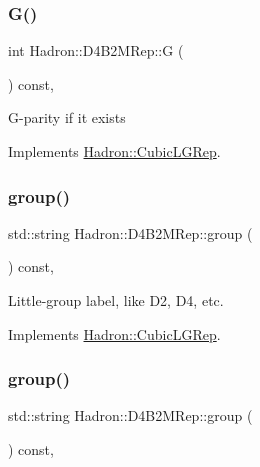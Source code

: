 \subsubsection{\texorpdfstring{G()}{G()}\hspace{0.1cm}{\footnotesize\ttfamily [2/2]}}
{\footnotesize\ttfamily int Hadron\+::\+D4\+B2\+M\+Rep\+::G (\begin{DoxyParamCaption}{ }\end{DoxyParamCaption}) const\hspace{0.3cm}{\ttfamily [inline]}, {\ttfamily [virtual]}}

G-\/parity if it exists 

Implements \mbox{\hyperlink{structHadron_1_1CubicLGRep_ace26f7b2d55e3a668a14cb9026da5231}{Hadron\+::\+Cubic\+L\+G\+Rep}}.

\mbox{\label{structHadron_1_1D4B2MRep_a46c379ad06e057f5ca60549e8a373d01}} 
\subsubsection{\texorpdfstring{group()}{group()}\hspace{0.1cm}{\footnotesize\ttfamily [1/2]}}
{\footnotesize\ttfamily std\+::string Hadron\+::\+D4\+B2\+M\+Rep\+::group (\begin{DoxyParamCaption}{ }\end{DoxyParamCaption}) const\hspace{0.3cm}{\ttfamily [inline]}, {\ttfamily [virtual]}}

Little-\/group label, like D2, D4, etc. 

Implements \mbox{\hyperlink{structHadron_1_1CubicLGRep_a9bdb14b519a611d21379ed96a3a9eb41}{Hadron\+::\+Cubic\+L\+G\+Rep}}.

\mbox{\label{structHadron_1_1D4B2MRep_a46c379ad06e057f5ca60549e8a373d01}} 
\subsubsection{\texorpdfstring{group()}{group()}\hspace{0.1cm}{\footnotesize\ttfamily [2/2]}}
{\footnotesize\ttfamily std\+::string Hadron\+::\+D4\+B2\+M\+Rep\+::group (\begin{DoxyParamCaption}{ }\end{DoxyParamCaption}) const\hspace{0.3cm}{\ttfamily [inline]}, {\ttfamily [virtual]}}

